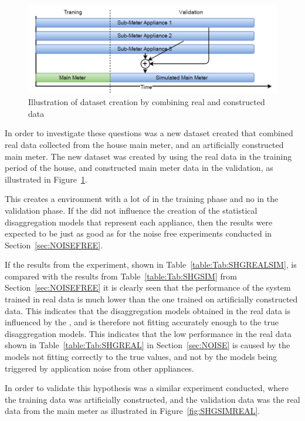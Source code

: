 \begin{figure}[H]
\centering
\includegraphics[width=1\textwidth]{billeder/REALSIM.png}
\caption{Illustration of dataset creation by combining real and constructed data}
\label{fig:REALSIMILU}
\end{figure}

In order to investigate these questions was a new dataset created that combined real data collected from the house main meter, and an artificially constructed main meter. The new dataset was created by using the real data in the training period of the house, and constructed main meter data in the validation, as illustrated in Figure~\ref{fig:REALSIMILU}.

This creates a environment with a lot of  in the training phase and no  in the validation phase. If the  did not influence the creation of the statistical disaggregation models that represent each appliance, then the results were expected to be just as good as for the noise free experiments conducted in Section~\ref{sec:NOISEFREE}.




If the results from the experiment, shown in Table~\ref{table:Tab:SHGREALSIM}, is compared with the results from Table~\ref{table:Tab:SHGSIM} from Section~\ref{sec:NOISEFREE} it is clearly seen that the performance of the system trained in real data is much lower than the one trained on artificially constructed data. This indicates that the disaggregation models obtained in the real data is influenced by the , and is therefore not fitting accurately enough to the true disaggregation models. This indicates that the low performance in the real data shown in Table~\ref{table:Tab:SHGREAL} in Section~\ref{sec:NOISE} is caused by the models not fitting correctly to the true values, and not by the models being triggered by application noise from other appliances.

In order to validate this hypothesis was a similar experiment conducted, where the training data was artificially constructed, and the validation data was the real data from the main meter as illustrated in Figure~\ref{fig:SHGSIMREAL}. 

